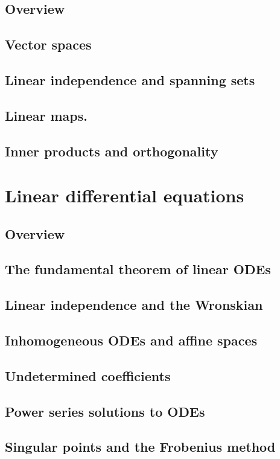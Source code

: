 \documentclass{article}
\begin{document}
\subsection*{Overview}
\subsection{Vector spaces}
\subsection{Linear independence and spanning sets}
\subsection{Linear maps.}
\subsection{Inner products and orthogonality}
\pagebreak
\section{Linear differential equations}
\subsection*{Overview}
\subsection{The fundamental theorem of linear ODEs}
\subsection{Linear independence and the Wronskian}
\subsection{Inhomogeneous ODEs and affine spaces}
\subsection{Undetermined coefficients}
\subsection{Power series solutions to ODEs}
\subsection{Singular points and the Frobenius method}
\end{document}

